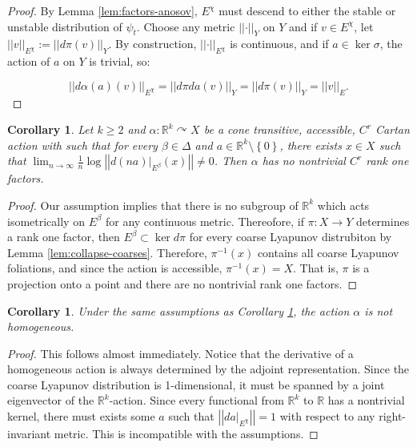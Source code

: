 \documentclass[12pt]{amsart}
\newtheorem{corollary}[theorem]{Corollary}
\theoremstyle{definition}
\theoremstyle{remark}
\numberwithin{equation}{section}
\newcommand{\R}{\mathbb{R}}
\newcommand{\set}[1]{\left\lbrace #1 \right\rbrace}
\newcommand{\norm}[1]{{\left|\left| #1 \right|\right|}}
\newtheorem{Structural Stability Theorem}[theorem]{Structural Stability Theorem}
\begin{document}
\begin{proof}
By Lemma \ref{lem:factors-anosov}, $E^\chi$ must descend to either the stable or unstable distribution of $\psi_t$. 
Choose any metric $\norm{\cdot}_Y$ on $Y$ and if $v \in E^\chi$, let $\norm{v}_{E^\chi} := \norm{d\pi(v)}_Y$. %
By construction, $\norm{\cdot}_{E^\chi}$ is continuous, and if $a \in \ker \sigma$, the action of $a$ on $Y$ is trivial, so:

\[\norm{d\alpha(a)(v)}_{E^\chi} = \norm{d\pi da(v)}_Y = \norm{d\pi(v)}_Y = \norm{v}_E. \] 
\end{proof}

\begin{corollary}
\label{cor:no-rank1-criteria}
Let $k \ge 2$ and $\alpha : \R^k \curvearrowright X$ be a cone transitive, accessible, $C^r$ Cartan action with such that for every $\beta \in \Delta$ and $a \in \R^k \setminus \set{0}$, there exists $x \in X$ such that $\displaystyle\lim_{n \to \infty} \frac{1}{n}\log \norm{d(na)|_{E^\beta}(x)} \not= 0$. Then $\alpha$ has no nontrivial $C^r$ rank one factors.
\end{corollary}

\begin{proof}
Our assumption implies that there is no subgroup of $\R^k$ which acts isometrically on $E^\beta$ for any continuous metric. Thereofore, if $\pi : X \to Y$ determines a rank one factor, then $E^\beta \subset \ker d\pi$ for every coarse Lyapunov distrubiton by Lemma \ref{lem:collapse-coarses}. Therefore, $\pi^{-1}(x)$ contains all coarse Lyapunov foliations, and since the action is accessible, $\pi^{-1}(x) = X$. That is, $\pi$ is a projection onto a point and there are no nontrivial rank one factors.
\end{proof}

\begin{corollary}
\label{cor:non-homogeneous}
Under the same assumptions as Corollary \ref{cor:no-rank1-criteria}, the action $\alpha$ is not homogeneous.
\end{corollary}

\begin{proof}
This follows almost immediately. Notice that the derivative of a homogeneous action is always determined by the adjoint representation. Since the coarse Lyapunov distribution is 1-dimensional, it must be spanned by a joint eigenvector of the $\R^k$-action. Since every functional from $\R^k$ to $\R$ has a nontrivial kernel, there must exists some $a$ such that $\norm{da|_{E^\chi}} =1$ with respect to any right-invariant metric. This is incompatible with the assumptions.
\end{proof}
\end{document}
